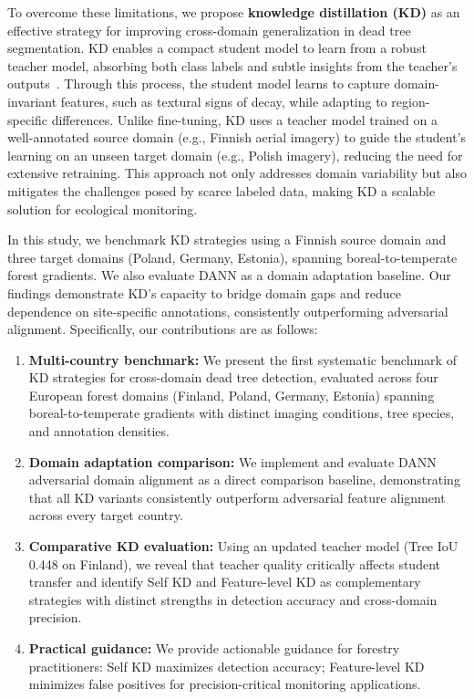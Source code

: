 \documentclass[twocolumn]{article}
\begin{document}
To overcome these limitations, we propose \textbf{knowledge distillation (KD)} as an effective strategy for improving cross-domain generalization in dead tree segmentation. KD enables a compact student model to learn from a robust teacher model, absorbing both class labels and subtle insights from the teacher's outputs~\citep{hinton2015distilling}. Through this process, the student model learns to capture domain-invariant features, such as textural signs of decay, while adapting to region-specific differences. Unlike fine-tuning, KD uses a teacher model trained on a well-annotated source domain (e.g., Finnish aerial imagery) to guide the student's learning on an unseen target domain (e.g., Polish imagery), reducing the need for extensive retraining. This approach not only addresses domain variability but also mitigates the challenges posed by scarce labeled data, making KD a scalable solution for ecological monitoring.

In this study, we benchmark KD strategies using a Finnish source domain and three target domains (Poland, Germany, Estonia), spanning boreal-to-temperate forest gradients. We also evaluate DANN as a domain adaptation baseline. Our findings demonstrate KD's capacity to bridge domain gaps and reduce dependence on site-specific annotations, consistently outperforming adversarial alignment. Specifically, our contributions are as follows:

\begin{enumerate}
\item \textbf{Multi-country benchmark:} We present the first systematic benchmark of KD strategies for cross-domain dead tree detection, evaluated across four European forest domains (Finland, Poland, Germany, Estonia) spanning boreal-to-temperate gradients with distinct imaging conditions, tree species, and annotation densities.
\item \textbf{Domain adaptation comparison:} We implement and evaluate DANN~\citep{ganin2016domain} adversarial domain alignment as a direct comparison baseline, demonstrating that all KD variants consistently outperform adversarial feature alignment across every target country.
\item \textbf{Comparative KD evaluation:} Using an updated teacher model (Tree IoU 0.448 on Finland), we reveal that teacher quality critically affects student transfer and identify Self KD and Feature-level KD as complementary strategies with distinct strengths in detection accuracy and cross-domain precision.
\item \textbf{Practical guidance:} We provide actionable guidance for forestry practitioners: Self KD maximizes detection accuracy; Feature-level KD minimizes false positives for precision-critical monitoring applications.
\end{enumerate}
\end{document}
